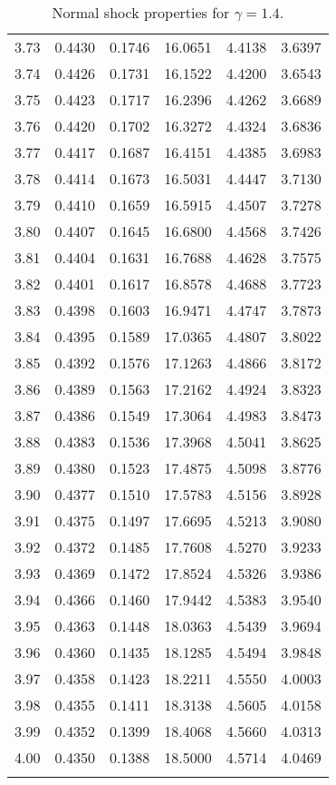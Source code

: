 \documentclass{article}
\begin{document}
\begin{longtable}{cccccc}
3.73 & 0.4430 & 0.1746 & 16.0651 & 4.4138 & 3.6397 \\
3.74 & 0.4426 & 0.1731 & 16.1522 & 4.4200 & 3.6543 \\
3.75 & 0.4423 & 0.1717 & 16.2396 & 4.4262 & 3.6689 \\
3.76 & 0.4420 & 0.1702 & 16.3272 & 4.4324 & 3.6836 \\
3.77 & 0.4417 & 0.1687 & 16.4151 & 4.4385 & 3.6983 \\
3.78 & 0.4414 & 0.1673 & 16.5031 & 4.4447 & 3.7130 \\
3.79 & 0.4410 & 0.1659 & 16.5915 & 4.4507 & 3.7278 \\
3.80 & 0.4407 & 0.1645 & 16.6800 & 4.4568 & 3.7426 \\
3.81 & 0.4404 & 0.1631 & 16.7688 & 4.4628 & 3.7575 \\
3.82 & 0.4401 & 0.1617 & 16.8578 & 4.4688 & 3.7723 \\
3.83 & 0.4398 & 0.1603 & 16.9471 & 4.4747 & 3.7873 \\
3.84 & 0.4395 & 0.1589 & 17.0365 & 4.4807 & 3.8022 \\
3.85 & 0.4392 & 0.1576 & 17.1263 & 4.4866 & 3.8172 \\
3.86 & 0.4389 & 0.1563 & 17.2162 & 4.4924 & 3.8323 \\
3.87 & 0.4386 & 0.1549 & 17.3064 & 4.4983 & 3.8473 \\
3.88 & 0.4383 & 0.1536 & 17.3968 & 4.5041 & 3.8625 \\
3.89 & 0.4380 & 0.1523 & 17.4875 & 4.5098 & 3.8776 \\
3.90 & 0.4377 & 0.1510 & 17.5783 & 4.5156 & 3.8928 \\
3.91 & 0.4375 & 0.1497 & 17.6695 & 4.5213 & 3.9080 \\
3.92 & 0.4372 & 0.1485 & 17.7608 & 4.5270 & 3.9233 \\
3.93 & 0.4369 & 0.1472 & 17.8524 & 4.5326 & 3.9386 \\
3.94 & 0.4366 & 0.1460 & 17.9442 & 4.5383 & 3.9540 \\
3.95 & 0.4363 & 0.1448 & 18.0363 & 4.5439 & 3.9694 \\
3.96 & 0.4360 & 0.1435 & 18.1285 & 4.5494 & 3.9848 \\
3.97 & 0.4358 & 0.1423 & 18.2211 & 4.5550 & 4.0003 \\
3.98 & 0.4355 & 0.1411 & 18.3138 & 4.5605 & 4.0158 \\
3.99 & 0.4352 & 0.1399 & 18.4068 & 4.5660 & 4.0313 \\
4.00 & 0.4350 & 0.1388 & 18.5000 & 4.5714 & 4.0469 \\
\bottomrule
\caption{Normal shock properties for $\gamma = 1.4$.}
\end{longtable}
\end{document}
